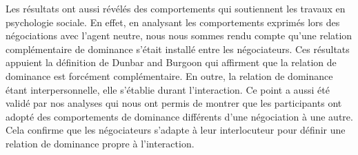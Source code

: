 	Les résultats ont aussi révélés des comportements qui soutiennent les travaux en psychologie sociale. En effet, en analysant les comportements exprimés lors des négociations avec l'agent neutre, nous nous sommes rendu compte qu'une relation complémentaire de dominance s'était installé entre les négociateurs. Ces résultats appuient la définition de Dunbar and Burgoon \cite{dunbar2005perceptions} qui affirment que la relation de dominance est forcément complémentaire. En outre, la relation de dominance étant interpersonnelle, elle s'établie durant l'interaction. Ce point a aussi été validé par nos analyses qui nous ont permis de montrer que les participants ont adopté des comportements de dominance différents d'une négociation à une autre. Cela confirme que les négociateurs s'adapte à leur interlocuteur pour définir une relation de dominance propre à l'interaction. 